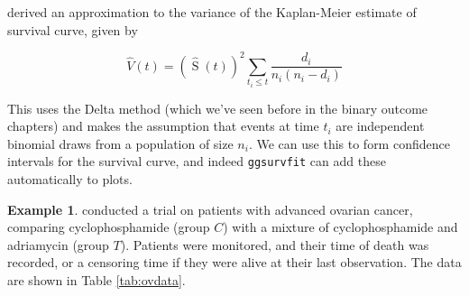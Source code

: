 \documentclass[
  openany]{book}
\theoremstyle{definition}
\theoremstyle{definition}
\newtheorem{example}{Example}[chapter]
\theoremstyle{definition}
\theoremstyle{definition}
\theoremstyle{remark}
\begin{document}
\citet{greenwood1926natural} derived an approximation to the variance of the Kaplan-Meier estimate of survival curve, given by

\[\hat{V}\left(t\right) = \left(\hat{\operatorname{S}}\left(t\right)\right)^2\sum\limits_{t_{i}\leq{t}} \frac{d_i}{n_i\left(n_i-d_i\right)} \]

This uses the Delta method (which we've seen before in the binary outcome chapters) and makes the assumption that events at time \(t_i\) are independent binomial draws from a population of size \(n_i\). We can use this to form confidence intervals for the survival curve, and indeed \texttt{ggsurvfit} can add these automatically to plots.

\begin{example}
\protect\hypertarget{exm:surveg1}{}\label{exm:surveg1}\citet{edmonson1979prognosis} conducted a trial on patients with advanced ovarian cancer, comparing cyclophosphamide (group \(C\)) with a mixture of cyclophosphamide and adriamycin (group \(T\)). Patients were monitored, and their time of death was recorded, or a censoring time if they were alive at their last observation. The data are shown in Table \ref{tab:ovdata}.


\end{example}
\end{document}
